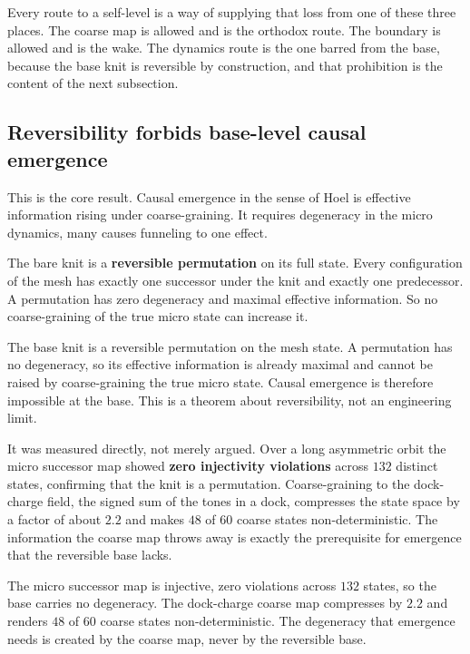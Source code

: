 Every route to a self-level is a way of supplying that loss from one of these three places. The coarse map is allowed and is the orthodox route. The boundary is allowed and is the wake. The dynamics route is the one barred from the base, because the base knit is reversible by construction, and that prohibition is the content of the next subsection.

\subsection{Reversibility forbids base-level causal emergence}

This is the core result. Causal emergence in the sense of Hoel is effective information rising under coarse-graining. It requires degeneracy in the micro dynamics, many causes funneling to one effect.

The bare knit is a \textbf{reversible permutation} on its full state. Every configuration of the mesh has exactly one successor under the knit and exactly one predecessor. A permutation has zero degeneracy and maximal effective information. So no coarse-graining of the true micro state can increase it.

\begin{theorem}
The base knit is a reversible permutation on the mesh state. A permutation has no degeneracy, so its effective information is already maximal and cannot be raised by coarse-graining the true micro state. Causal emergence is therefore impossible at the base. This is a theorem about reversibility, not an engineering limit.
\end{theorem}

It was measured directly, not merely argued. Over a long asymmetric orbit the micro successor map showed \textbf{zero injectivity violations} across $132$ distinct states, confirming that the knit is a permutation. Coarse-graining to the dock-charge field, the signed sum of the tones in a dock, compresses the state space by a factor of about $2.2$ and makes $48$ of $60$ coarse states non-deterministic. The information the coarse map throws away is exactly the prerequisite for emergence that the reversible base lacks.

\begin{result}
The micro successor map is injective, zero violations across $132$ states, so the base carries no degeneracy. The dock-charge coarse map compresses by $2.2$ and renders $48$ of $60$ coarse states non-deterministic. The degeneracy that emergence needs is created by the coarse map, never by the reversible base.
\end{result}

